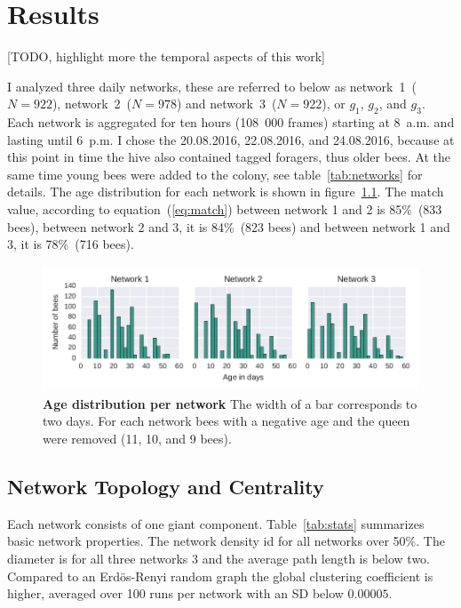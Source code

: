 \chapter{Results}
\label{ch:results}

[TODO, highlight more the temporal aspects of this work]

I analyzed three daily networks, these are referred to below as network~1~($N=922$), network~2~($N=978$) and network~3~($N=922$), or $g_1$, $g_2$, and $g_3$. Each network is aggregated for ten hours (108~000 frames) starting at 8~a.m. and lasting until 6~p.m. I chose the 20.08.2016, 22.08.2016, and 24.08.2016, because at this point in time the hive also contained tagged foragers, thus older bees. At the same time young bees were added to the colony, see table~\ref{tab:networks} for details. The age distribution for each network is shown in figure~\ref{fig:ages}. The match value, according to equation~(\ref{eq:match}) between network 1 and 2 is 85\%~(833 bees), between network 2 and 3, it is 84\%~(823 bees) and between network 1 and 3, it is 78\%~(716 bees).




\begin{figure}[htb]
	\centering
	\includegraphics[width=1.0\textwidth]{Figures/ages}
	\caption[Age distribution per network]{\textbf{Age distribution per network} The width of a bar corresponds to two days. For each network bees with a negative age and the queen were removed (11, 10, and 9 bees).}
	\label{fig:ages}
\end{figure}


\section{Network Topology and Centrality}

Each network consists of one giant component. Table~\ref{tab:stats} summarizes basic network properties. The network density id for all networks over 50\%. The diameter is for all three networks $3$ and the average path length is below two. Compared to an Erdös-Renyi random graph the global clustering coefficient is higher, averaged over 100 runs per network with an SD below $0.00005$.

